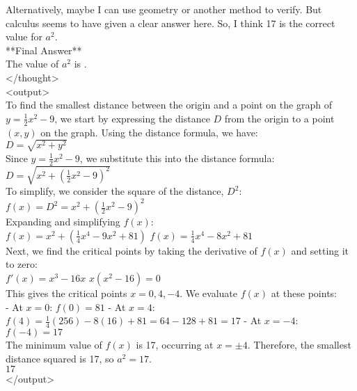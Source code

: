 \begin{abox}
Alternatively, maybe I can use geometry or another method to verify. But calculus seems to have given a clear answer here. So, I think 17 is the correct value for $ a^2 $.\\

**Final Answer**\\
The value of $ a^2 $ is .\\
</thought>\\

<output>\\
To find the smallest distance between the origin and a point on the graph of $ y = \frac{1}{2}x^2 - 9 $, we start by expressing the distance $ D $ from the origin to a point $ (x, y) $ on the graph. Using the distance formula, we have:\\
$ D = \sqrt{x^2 + y^2} $\\

Since $ y = \frac{1}{2}x^2 - 9 $, we substitute this into the distance formula:\\
$ D = \sqrt{x^2 + \left( \frac{1}{2}x^2 - 9 \right)^2} $\\

To simplify, we consider the square of the distance, $ D^2 $:\\
$ f(x) = D^2 = x^2 + \left( \frac{1}{2}x^2 - 9 \right)^2 $\\

Expanding and simplifying $ f(x) $:\\
$ f(x) = x^2 + \left( \frac{1}{4}x^4 - 9x^2 + 81 \right) $
$ f(x) = \frac{1}{4}x^4 - 8x^2 + 81 $\\

Next, we find the critical points by taking the derivative of $ f(x) $ and setting it to zero:\\
$ f'(x) = x^3 - 16x $
$ x(x^2 - 16) = 0 $\\

This gives the critical points $ x = 0, 4, -4 $. We evaluate $ f(x) $ at these points:\\

- At $ x = 0 $:
  $ f(0) = 81 $
- At $ x = 4 $:
  $ f(4) = \frac{1}{4}(256) - 8(16) + 81 = 64 - 128 + 81 = 17 $
- At $ x = -4 $:
  $ f(-4) = 17 $\\

The minimum value of $ f(x) $ is 17, occurring at $ x = \pm 4 $. Therefore, the smallest distance squared is 17, so $ a^2 = 17 $.\\
$
\boxed{17}
$\\
</output>
\end{abox}


